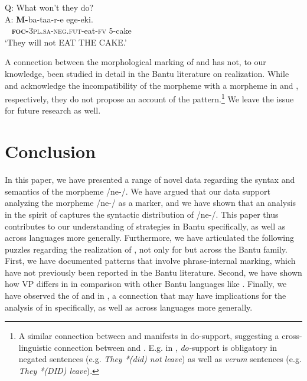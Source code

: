 \documentclass[output=paper,modfonts]{langscibook}
\begin{document}
\ea\label{ex:landmann:53}
  Q: What won’t they do?\\
  \gll A: \textbf{M-}ba-taa-r-e ege-eki.\\
    ~ \textsc{\textbf{foc-}}\textsc{3pl}.\textsc{sa}-\textsc{neg.fut}-eat-\textsc{fv} 5-cake\\
\glt ‘They will not EAT THE CAKE.’
\z

A connection between the morphological marking of  and  has not, to our knowledge, been studied in detail in the Bantu literature on  realization. While \citet{Schwarz2007} and \citet{AbelsMuriungi2008} acknowledge the incompatibility of the  morpheme with a  morpheme in  and , respectively, they do not propose an account of the pattern.\footnote{A similar connection between  and  manifests in  do-support, suggesting a cross-linguistic connection between  and . E.g. in , \textit{do-}support is obligatory in negated sentences (e.g. \textit{They *(did) not leave}) as well as \textit{verum}  sentences (e.g. \textit{They *(DID) leave}).} We leave the issue for future research as well.


 \section{Conclusion}


In this paper, we have presented a range of novel data regarding the syntax and semantics of the  morpheme /ne-/. We have argued that our data support analyzing the morpheme /ne-/ as a  marker, and we have shown that an analysis in the spirit of \citet{Schwarz2007} captures the syntactic distribution of /ne-/. This paper thus contributes to our understanding of  strategies in Bantu specifically, as well as across languages more generally. Furthermore, we have articulated the following puzzles regarding the realization of , not only for  but across the Bantu family. First, we have documented patterns that involve phrase-internal  marking, which have not previously been reported in the Bantu literature. Second, we have shown how VP  differs in  in comparison with other Bantu languages like . Finally, we have observed the  of  and  in , a connection that may have implications for the analysis of  in  specifically, as well as  across languages more generally.
\end{document}
